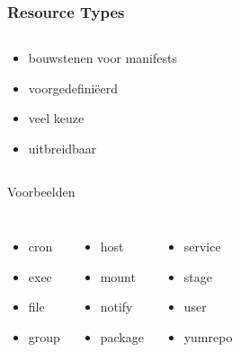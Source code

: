 \documentclass{beamer}
\begin{document}
\begin{frame}
\frametitle{Resource Types}
\begin{columns}[t]
\begin{block}{}
\begin{itemize}
	\item bouwstenen voor manifests
	\item voorgedefini\"eerd
	\item veel keuze
	\item uitbreidbaar
\end{itemize}
\end{block}
\end{columns}
\begin{block}{Voorbeelden}
\begin{columns}[b]
\begin{itemize}
	\item cron
	\item exec
	\item file
	\item group
\end{itemize}
\begin{itemize}
	\item host
	\item mount
	\item notify
	\item package
\end{itemize}
\begin{itemize}
	\item service
	\item stage
	\item user
	\item yumrepo
\end{itemize}
\end{columns}
\end{block}
\end{frame}
\end{document}
